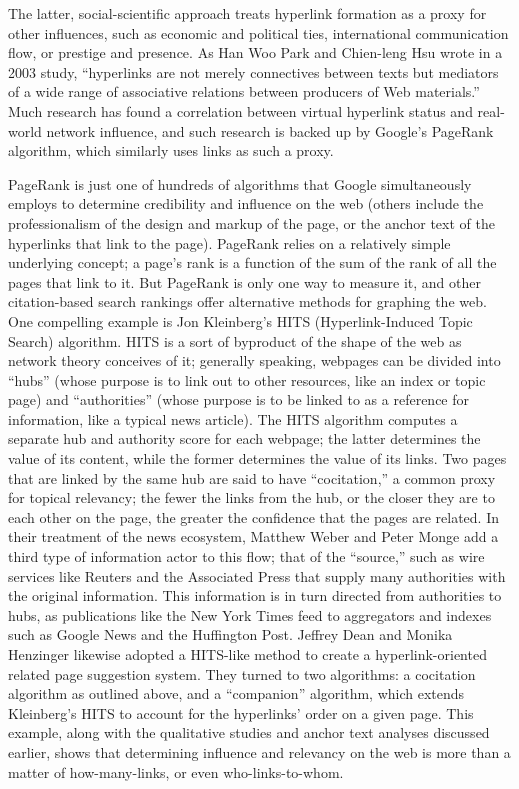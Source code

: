 The latter, social-scientific approach treats hyperlink formation as a proxy for other influences, such as economic and political ties, international communication flow, or prestige and presence. As Han Woo Park and Chien-leng Hsu wrote in a 2003 study, ``hyperlinks are not merely connectives between texts but mediators of a wide range of associative relations between producers of Web materials.''\autocite[357]{hsu_sociology_2010} Much research has found a correlation between virtual hyperlink status and real-world network influence, and such research is backed up by Google's PageRank algorithm, which similarly uses links as such a proxy.

PageRank is just one of hundreds of algorithms that Google simultaneously employs to determine credibility and influence on the web (others include the professionalism of the design and markup of the page, or the anchor text of the hyperlinks that link to the page). PageRank relies on a relatively simple underlying concept; a page's rank is a function of the sum of the rank of all the pages that link to it. But PageRank is only one way to measure it, and other citation-based search rankings offer alternative methods for graphing the web. One compelling example is Jon Kleinberg's HITS (Hyperlink-Induced Topic Search) algorithm. HITS is a sort of byproduct of the shape of the web as network theory conceives of it; generally speaking, webpages can be divided into ``hubs'' (whose purpose is to link out to other resources, like an index or topic page) and ``authorities'' (whose purpose is to be linked to as a reference for information, like a typical news article). The HITS algorithm computes a separate hub and authority score for each webpage; the latter determines the value of its content, while the former determines the value of its links.\autocite{kleinberg_authoritative_1999} Two pages that are linked by the same hub are said to have ``cocitation,'' a common proxy for topical relevancy; the fewer the links from the hub, or the closer they are to each other on the page, the greater the confidence that the pages are related. In their treatment of the news ecosystem, Matthew Weber and Peter Monge add a third type of information actor to this flow; that of the ``source,'' such as wire services like Reuters and the Associated Press that supply many authorities with the original information. This information is in turn directed from authorities to hubs, as publications like the New York Times feed to aggregators and indexes such as Google News and the Huffington Post.\autocite{weber_flow_2011} Jeffrey Dean and Monika Henzinger likewise adopted a HITS-like method to create a hyperlink-oriented related page suggestion system. They turned to two algorithms: a cocitation algorithm as outlined above, and a ``companion'' algorithm, which extends Kleinberg's HITS to account for the hyperlinks' order on a given page.\autocite{dean_finding_1999} This example, along with the qualitative studies and anchor text analyses discussed earlier, shows that determining influence and relevancy on the web is more than a matter of how-many-links, or even who-links-to-whom.

